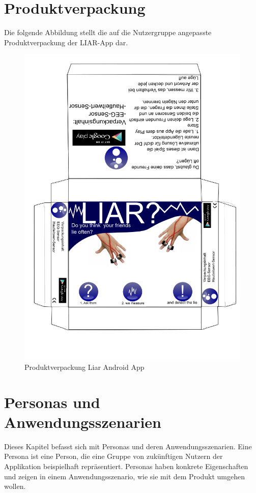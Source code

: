 \documentclass[10pt, a4paper, oneside, titlepage]{scrartcl} %
\begin{document}
   	\section{Produktverpackung}
   	Die folgende Abbildung stellt die auf die Nutzergruppe angepasste Produktverpackung der LIAR-App dar.
	\begin{figure}[ht!]
	\begin{center}
		\includegraphics[scale=0.5]{verpackung_bjoern.png}
	\end{center}
	\caption[Produktverpackung]{Produktverpackung Liar Android App}
	\label{fig:verpackung}
	\end{figure}   
   
   	\newpage
   	\section{Personas und Anwendungsszenarien}
   	Dieses Kapitel befasst sich mit Personas und deren Anwendungsszenarien. Eine Persona ist eine Person, die eine Gruppe von zukünftigen Nutzern der Applikation beispielhaft repräsentiert. Personas haben konkrete Eigenschaften und zeigen in einem Anwendungsszenario, wie sie mit dem Produkt umgehen wollen.
   	
\end{document}

